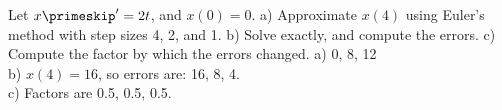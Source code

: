 {Let $x\primeskip' = 2t$, and $x(0)=0$.
a) Approximate $x(4)$ using Euler's method with step sizes 4, 2, and 1.
b) Solve exactly, and compute the errors.
c) Compute the factor by which the errors changed.}
{
a) 0, 8, 12
\\
b) $x(4) = 16$, so errors are: 16, 8, 4.
\\
c) Factors are 0.5, 0.5, 0.5.}